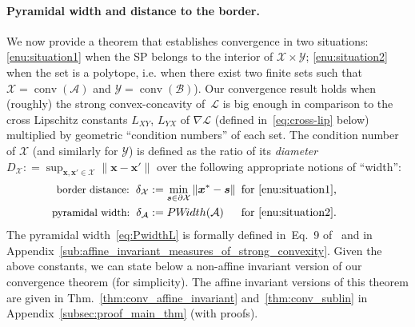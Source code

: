 \documentclass[twoside]{article}
\renewcommand{\L}{\mathcal{L}}
\newcommand{\X}{\mathcal{X}}
\newcommand{\Y}{\mathcal{Y}}
\newcommand{\M}{\X \times \Y}
\newcommand{\x}{\bm{x}}
\newcommand{\s}{\bm{s}}
\DeclareMathOperator*{\conv}{conv}
\newcommand{\PWidth}{\mathop{PW\!idth}}
\newcommand{\0}{\mathbf{0}} %
\begin{document}
\paragraph{Pyramidal width and distance to the border.} %
\label{par:pyramidal_width}
We now provide a theorem that establishes convergence in two situations: \eqref{enu:situation1} when the SP belongs to the interior of $\M$; \eqref{enu:situation2} when the set is a polytope, i.e. when there exist two finite sets such that $\X = \conv(\mathcal A)$ and $\Y = \conv(\mathcal B)$).
Our convergence result holds when (roughly) the strong convex-concavity of~$\L$ is big enough in comparison to the cross Lipschitz constants $L_{XY}$, $L_{YX}$ of $\nabla \L$ (defined in~\eqref{eq:cross-lip} below) multiplied by geometric ``condition numbers'' of each set. The condition number of $\X$ (and similarly for $\Y$) is defined as the ratio of its \emph{diameter} $D_\X : = \sup_{\x, \x' \in \X} \|\x -\x'\|$ over the following appropriate notions of ``width'':
\begin{align} 
\hspace{-7mm}\text{\small border distance: }\, \delta_\X &:= \min_{\s \in \partial  \X} \|\x^* -\s\|  \!\!\! &&\text{for \eqref{enu:situation1},} \hspace{-2mm} \\
\hspace{-7mm}\text{\small pyramidal width: }\, \delta_{\mathcal A} &:=\PWidth(\mathcal A)  &&\text{for \eqref{enu:situation2}.} & \label{eq:PwidthL} \hspace{-2mm}
\end{align}
The pyramidal width~\eqref{eq:PwidthL} is formally defined in~Eq.~9 of~\citet{lacoste2015global} and in  Appendix~\ref{sub:affine_invariant_measures_of_strong_convexity}.
Given the above constants, we can state below a non-affine invariant version of our convergence theorem (for simplicity). The affine invariant versions of this theorem are given in Thm.~\ref{thm:conv_affine_invariant} and~\ref{thm:conv_sublin} in Appendix~\ref{subsec:proof_main_thm} (with proofs).
\end{document}
